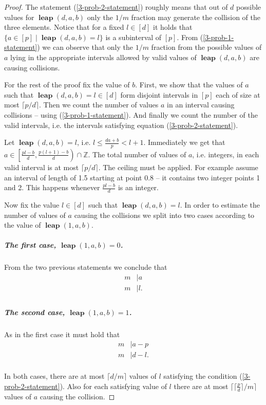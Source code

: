 \documentclass{article}
\newcommand{\leap}[3]{\operatorname{\mathbf{leap}}({#1}, {#2}, {#3})}
\begin{document}
\begin{proof}
The statement (\ref{3-prob-2-statement}) roughly means that out of $d$ possible values for $\leap{d}{a}{b}$ only the $1 / m$ fraction may generate the collision of the three elements. Notice that for a fixed $l \in [d]$ it holds that $\{a \in [p] \mid \leap{d}{a}{b} = l\}$ is a subinterval of $[p]$.
From (\ref{3-prob-1-statement}) we can observe that only the $1 / m$ fraction from the possible values of $a$ lying in the appropriate intervals allowed by valid values of $\leap{d}{a}{b}$ are causing collisions.

For the rest of the proof fix the value of $b$. 
First, we show that the values of $a$ such that $\leap{d}{a}{b} = l \in [d]$ form disjoint intervals in $[p]$ each of size at most $\lceil p/d \rceil$.
Then we count the number of values $a$ in an interval causing collisions -- using (\ref{3-prob-1-statement}).
And finally we count the number of the valid intervals, i.e. the intervals satisfying equation (\ref{3-prob-2-statement}).

Let $\leap{d}{a}{b} = l$, i.e. $l \leq \frac{da + b}{p} < l + 1$. Immediately we get that $a \in \left[\frac{pl - b}{d}, \frac{p(l + 1) - b}{d}\right) \cap \mathbb{Z}$. The total number of values of $a$, i.e. integers, in each valid interval is at most $\lceil p / d \rceil$. The ceiling must be applied. For example assume an interval of length of 1.5 starting at point 0.8 -- it contains two integer points 1 and 2. This happens whenever $\frac{pl - b}{d}$ is an integer.

Now fix the value $l \in [d]$ such that $\leap{d}{a}{b} = l$.
In order to estimate the number of values of $a$ causing the collisions we split into two cases according to the value of $\leap{1}{a}{b}$.

\subparagraph{The first case, $\leap{1}{a}{b} = 0$.} 
From the two previous statements we conclude that
\begin{align*}
	m & \mid a \\
	m & \mid l. \\
\end{align*}

\subparagraph{The second case, $\leap{1}{a}{b} = 1$.}
As in the first case it must hold that
\begin{align*}
	m & \mid a - p \\
	m & \mid d - l. \\
\end{align*}

In both cases, there are at most $\lceil d/m \rceil$ values of $l$ satisfying the  condition (\ref{3-prob-2-statement}).
Also for each satisfying value of $l$ there are at most $\lceil \lceil\frac{p}{d}\rceil / m \rceil$ values of $a$ causing the collision.

\end{proof}
\end{document}
